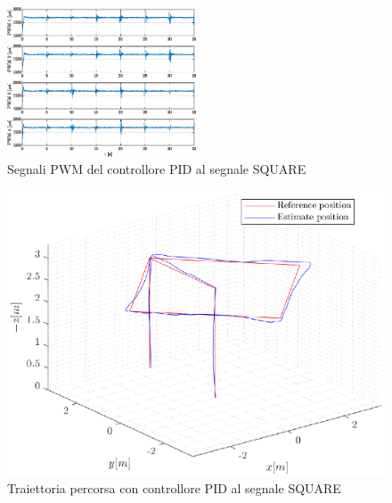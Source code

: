 \begin{figure}
	\centering
	\includegraphics[width=0.5\textwidth]{Simulazioni/Figure/PID/SQUARE/PWM}
	\caption{Segnali PWM del controllore PID al segnale SQUARE}
	\label{fig:SQUAREPWMPID}
\end{figure}
\begin{figure}
	\centering
	\includegraphics[width=1\textwidth]{Simulazioni/Figure/PID/SQUARE/Trajectory}
	\caption{Traiettoria percorsa con controllore PID al segnale SQUARE}
	\label{fig:SQUAREtraPID}
\end{figure}


